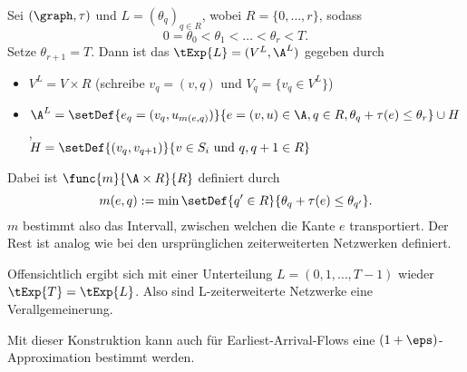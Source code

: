 \begin{definition}
    Sei $(\graph, \tau)$ und $L = (\theta_q)_{q \in R}$, wobei $R = \{0, \ldots, r\}$,
    sodass
    \[
        0 = \theta_0 < \theta_1 < \ldots < \theta_r < T.
    \]
    Setze $\theta_{r+1} = T$.
    Dann ist das  $\tExp{L} = (V^L, \A^L)$
    gegeben durch
    \begin{itemize}
        \item $V^L = V \times R$ (schreibe $v_q = (v, q)$ und
            $V_q = \{v_q \in V^L\}$)
        \item $\A^L = \setDef{e_q = (v_q, u_{m(e, q)})}
                        {e = (v, u) \in \A, q \in R, \theta_q + \tau(e) \leq \theta_r}
                    \cup H$, \\
             $H = \setDef{(v_q, v_{q+1})}
                                    {v \in S_i \text{ und } q, q+1 \in R}$
    \end{itemize}

    Dabei ist $\func{m}{\A \times R}{R}$ definiert durch
    \[
        m(e, q) := \min \setDef{q' \in R}{\theta_q + \tau(e) \leq \theta_{q'}}.
    \]
    $m$ bestimmt also das Intervall, zwischen welchen die Kante $e$ transportiert.
    Der Rest ist analog wie bei den ursprünglichen zeiterweiterten Netzwerken
    definiert.
\end{definition}

\begin{remark}
    Offensichtlich ergibt sich mit einer Unterteilung $L = (0, 1, \ldots, T-1)$
    wieder $\tExp{T} = \tExp{L}$. Also sind L-zeiterweiterte Netzwerke
    eine Verallgemeinerung.
\end{remark}

Mit dieser Konstruktion kann auch für Earliest-Arrival-Flows eine
$(1+\eps)$-Approximation bestimmt werden.
